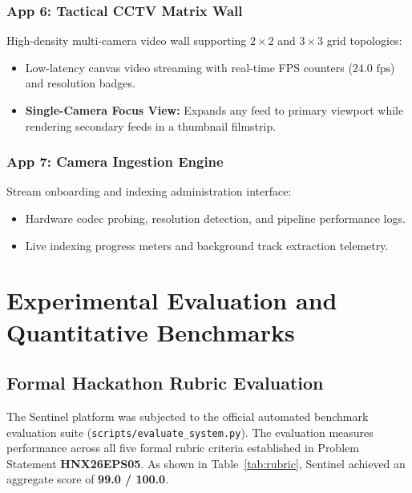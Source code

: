 \documentclass[12pt,a4paper]{article}
\begin{document}
\subsubsection{App 6: Tactical CCTV Matrix Wall}
High-density multi-camera video wall supporting $2 \times 2$ and $3 \times 3$ grid topologies:
\begin{itemize}
    \item Low-latency canvas video streaming with real-time FPS counters ($24.0\text{ fps}$) and resolution badges.
    \item \textbf{Single-Camera Focus View:} Expands any feed to primary viewport while rendering secondary feeds in a thumbnail filmstrip.
\end{itemize}

\subsubsection{App 7: Camera Ingestion Engine}
Stream onboarding and indexing administration interface:
\begin{itemize}
    \item Hardware codec probing, resolution detection, and pipeline performance logs.
    \item Live indexing progress meters and background track extraction telemetry.
\end{itemize}

\section{Experimental Evaluation and Quantitative Benchmarks}

\subsection{Formal Hackathon Rubric Evaluation}
The Sentinel platform was subjected to the official automated benchmark evaluation suite (\texttt{scripts/evaluate\_system.py}). The evaluation measures performance across all five formal rubric criteria established in Problem Statement \textbf{HNX26EPS05}. As shown in Table~\ref{tab:rubric}, Sentinel achieved an aggregate score of \textbf{99.0 / 100.0}.
\end{document}
